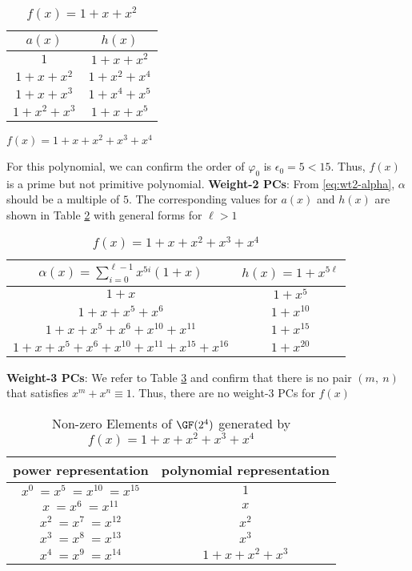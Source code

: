 \begin{example}
\begin{table}[htbp]
 \caption{$f(x)=1+x+x^2$}
\centering
 \begin{tabular}{c c} 
 \hline
 $a(x)$ & $h(x)$\\ [0.5ex] 
 \hline\hline
$1$ & $1+x+x^2$\\ 
\hline
$1+x+x^2$ &  $1+x^2+x^4$\\
\hline
$1+x+x^3$ & $1+x^4+x^5$\\
\hline
$1+x^2+x^3$ & $1+x+x^5$ 
 \end{tabular}
 \label{novelTab8}
\end{table}


\label{ex-1}
\end{example}




\begin{example}
$f(x)=1+x+x^2+x^3+x^4$

For this polynomial, we can confirm the order of $\varphi_0$ is $\epsilon_0=5< 15$. Thus, $f(x)$ is a prime but not primitive polynomial.
\newline
\textbf{Weight-2 PCs}: 
From \eqref{eq:wt2-alpha}, $\alpha$ should be a multiple of $5$. The corresponding values for $a(x)$ and $h(x)$ are shown in Table \ref{novelTab3} with general forms for $\ell>1$

\begin{table}[htbp]
\caption{$f(x)=1+x+x^2+x^3+x^4$}
\centering
\begin{tabular}{c c} 
 \hline
 $\alpha(x)=\sum_{i=0}^{\ell-1} x^{5i}(1+x)$ & $h(x)=1+x^{5\ell}$  \\ [0.5ex] 
 \hline\hline
$1+x$ &$1+x^5$\\ 
$1+x+x^5+x^6$ &$1+x^{10}$  \\
$1+x+x^5+x^6+x^{10}+x^{11}$ & $1+x^{15}$ \\
$1+x+x^5+x^6+x^{10}+x^{11}+x^{15}+x^{16}$ &$1+x^{20}$  
 \end{tabular}
 \label{novelTab3}
\end{table}
\textbf{Weight-3 PCs}:
We refer to Table \ref{novelTabWt3-2} and confirm that there is no pair $(m,~n)$ that satisfies $x^m+x^n \equiv 1$. Thus, there are no weight-3 PCs for $f(x)$
 \begin{table}[htbp]
 \caption{Non-zero Elements of $\GF (2^4)$ generated by $f(x)=1+x+x^2+x^3+x^4$}
\centering
 \begin{tabular}{c c} 
 \hline
 power representation & polynomial representation \\ [0.5ex] 
 \hline\hline
$x^0~=x^5~=x^{10}~=x^{15}$ & $1$\\
\hline
$x~=x^6~=x^{11}$ & $x$\\
\hline
$x^2~=x^7~=x^{12}$ &  $x^2$\\
\hline
$x^3~=x^8~=x^{13}$ &  $x^3$\\
\hline
$x^4~=x^9~=x^{14}$ &  $1+x+x^2+x^3$\\
\hline
 \end{tabular}
 \label{novelTabWt3-2}
\end{table}
\label{ex-2}
\end{example}

